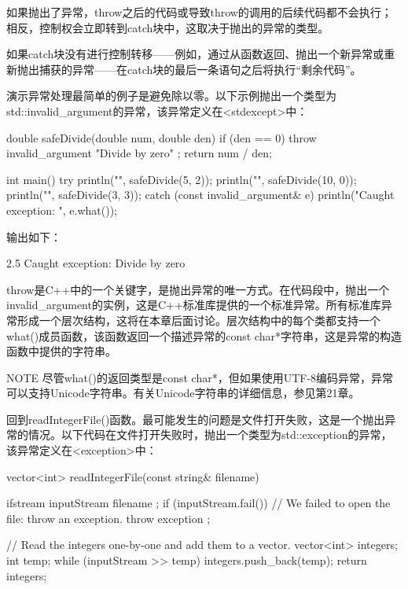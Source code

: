 如果抛出了异常，throw之后的代码或导致throw的调用的后续代码都不会执行；相反，控制权会立即转到catch块中，这取决于抛出的异常的类型。

如果catch块没有进行控制转移——例如，通过从函数返回、抛出一个新异常或重新抛出捕获的异常——在catch块的最后一条语句之后将执行“剩余代码”。

演示异常处理最简单的例子是避免除以零。以下示例抛出一个类型为std::invalid\_argument的异常，该异常定义在<stdexcept>中：

\begin{cpp}
double safeDivide(double num, double den)
{
    if (den == 0) { throw invalid_argument { "Divide by zero" }; }
    return num / den;
}

int main()
{
    try {
        println("{}", safeDivide(5, 2));
        println("{}", safeDivide(10, 0));
        println("{}", safeDivide(3, 3));
    } catch (const invalid_argument& e) {
        println("Caught exception: {}", e.what());
    }
}
\end{cpp}

输出如下：

\begin{shell}
2.5
Caught exception: Divide by zero
\end{shell}

throw是C++中的一个关键字，是抛出异常的唯一方式。在代码段中，抛出一个invalid\_argument的实例，这是C++标准库提供的一个标准异常。所有标准库异常形成一个层次结构，这将在本章后面讨论。层次结构中的每个类都支持一个what()成员函数，该函数返回一个描述异常的const char*字符串，这是异常的构造函数中提供的字符串。

\begin{myNotic}{NOTE}
尽管what()的返回类型是const char*，但如果使用UTF-8编码异常，异常可以支持Unicode字符串。有关Unicode字符串的详细信息，参见第21章。
\end{myNotic}

回到readIntegerFile()函数。最可能发生的问题是文件打开失败，这是一个抛出异常的情况。以下代码在文件打开失败时，抛出一个类型为std::exception的异常，该异常定义在<exception>中：

\begin{cpp}
vector<int> readIntegerFile(const string& filename)
{
    ifstream inputStream { filename };
    if (inputStream.fail()) {
        // We failed to open the file: throw an exception.
        throw exception {};
    }

    // Read the integers one-by-one and add them to a vector.
    vector<int> integers;
    int temp;
    while (inputStream >> temp) {
        integers.push_back(temp);
    }
    return integers;
}
\end{cpp}

